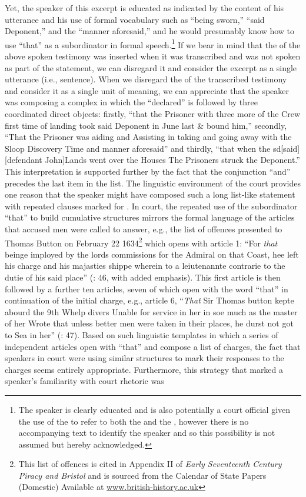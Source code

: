 Yet, the speaker of this excerpt is educated as indicated by the content of his utterance and his use of formal vocabulary such as “being sworn,” “said Deponent,” and the “manner aforesaid,” and he would presumably know how to use “that” as a subordinator in formal speech.\footnote{The speaker is clearly educated and is also potentially a court official given the use of the  to refer to both the  and the , however there is no accompanying text to identify the speaker and so this possibility is not assumed but hereby acknowledged.} If we bear in mind that the  of the above spoken testimony was inserted when it was transcribed and was not spoken as part of the statement, we can disregard it and consider the excerpt as a single utterance (i.e., sentence). When we disregard the  of the transcribed testimony and consider it as a single unit of meaning, we can appreciate that the speaker was composing a complex  in which the  “declared” is followed by three coordinated direct objects: firstly, “that the Prisoner with three more of the Crew first time of landing took said Deponent in June last \& bound him,” secondly, “That the Prisoner was aiding and Assisting in taking and going away with the Sloop Discovery Time and manner aforesaid” and thirdly, “that when the sd[said] [defendant John]Lands went over the Houses The Prisoners struck the Deponent.” This interpretation is supported further by the fact that the conjunction “and” precedes the last item in the list. The linguistic environment of the court provides one reason that the speaker might have composed such a long list-like statement with repeated clauses marked for . In court, the repeated use of the subordinator “that” to build cumulative structures mirrors the formal language of the articles that accused men were called to answer, e.g., the list of offences presented to Thomas Button on February 22 1634\footnote{This list of offences is cited in Appendix II of \textit{Early Seventeenth Century Piracy and Bristol} \citep[46-48]{Hill2013} and is sourced from the Calendar of State Papers (Domestic) Available at \href{http://www.british-history.ac.uk/}{{www.british-history.ac.uk}}} which opens with article 1: “For \textit{that} beinge imployed by the lords commissions for the Admiral on that Coast, hee left his charge and his majasties shippe wherein to a leiutenannte contrarie to the dutie of his said place” (\citealt{Hill2013}: 46, with added emphasis). This first article is then followed by a further ten articles, seven of which open with the word “that” in continuation of the initial charge, e.g., article 6, “\textit{That} Sir Thomas button kepte abourd the 9th Whelp divers Unable for service in her in soe much as the master of her Wrote that unless better men were taken in their places, he durst not got to Sea in her” (\citealt{Hill2013}: 47). Based on such linguistic templates in which a series of independent articles open with “that” and compose a list of charges, the fact that speakers in court were using similar structures to mark their responses to the charges seems entirely appropriate. Furthermore, this strategy that marked a speaker’s familiarity with court rhetoric was 